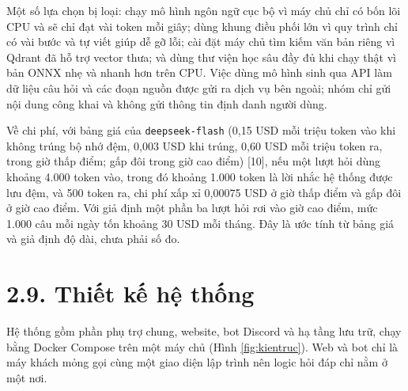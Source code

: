 Một số lựa chọn bị loại: chạy mô hình ngôn ngữ cục bộ vì máy chủ chỉ có bốn lõi CPU và sẽ chỉ đạt vài token mỗi giây; dùng khung điều phối lớn vì quy trình chỉ có vài bước và tự viết giúp dễ gỡ lỗi; cài đặt máy chủ tìm kiếm văn bản riêng vì Qdrant đã hỗ trợ vector thưa; và dùng thư viện học sâu đầy đủ khi chạy thật vì bản ONNX nhẹ và nhanh hơn trên CPU. Việc dùng mô hình sinh qua API làm dữ liệu câu hỏi và các đoạn nguồn được gửi ra dịch vụ bên ngoài; nhóm chỉ gửi nội dung công khai và không gửi thông tin định danh người dùng.


Về chi phí, với bảng giá của \texttt{deepseek-flash} (0,15 USD mỗi triệu token vào khi không trúng bộ nhớ đệm, 0,003 USD khi trúng, 0,60 USD mỗi triệu token ra, trong giờ thấp điểm; gấp đôi trong giờ cao điểm) [10], nếu một lượt hỏi dùng khoảng 4.000 token vào, trong đó khoảng 1.000 token là lời nhắc hệ thống được lưu đệm, và 500 token ra, chi phí xấp xỉ 0,00075 USD ở giờ thấp điểm và gấp đôi ở giờ cao điểm. Với giả định một phần ba lượt hỏi rơi vào giờ cao điểm, mức 1.000 câu mỗi ngày tốn khoảng 30 USD mỗi tháng. Đây là ước tính từ bảng giá và giả định độ dài, chưa phải số đo.


\section{2.9. Thiết kế hệ thống}

Hệ thống gồm phần phụ trợ chung, website, bot Discord và hạ tầng lưu trữ, chạy bằng Docker Compose trên một máy chủ (Hình \ref{fig:kientruc}). Web và bot chỉ là máy khách mỏng gọi cùng một giao diện lập trình nên logic hỏi đáp chỉ nằm ở một nơi.


